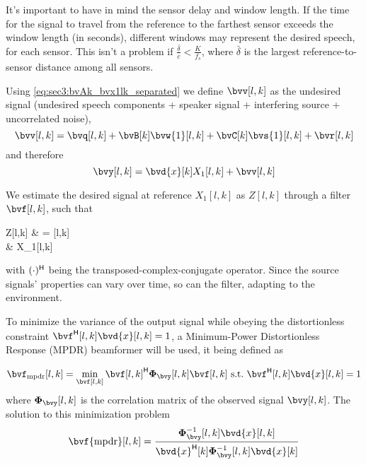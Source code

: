 It's important to have in mind the sensor delay and window length. If the time for the signal to travel from the reference to the farthest sensor exceeds the window length (in seconds), different windows may represent the desired speech, for each sensor. This isn't a problem if $\frac{\bar{\delta}}{c} < \frac{K}{f_s}$, where $\bar{\delta}$ is the largest reference-to-sensor distance among all sensors.

Using \cref{eq:sec3:bvAk_bvx1lk_separated} we define $\bvv[l,k]$ as the undesired signal (undesired speech components + speaker signal + interfering source + uncorrelated noise),
\begin{equation}
	\label{eq:sec3:def_undes_sig_bvwlk}
	\bvv[l,k] = \bvq[l,k] + \bvB[k] \bvw{1}[l,k] + \bvC[k] \bvs{1}[l,k] + \bvr[l,k]
\end{equation}
and therefore
\begin{equation}
	\label{eq:sec3:time-freq_model_final}
	\bvy[l,k] = \bvd{x}[k] X_1[l,k] + \bvv[l,k]
\end{equation}

We estimate the desired signal at reference $X_1[l,k]$ as $Z[l,k]$ through a filter $\bvf[l,k]$, such that
\begin{equations}
	Z[l,k]
	& = \he{\bvf}[l,k] \bvy[l,k] \\
	& \approx X_1[l,k]
\end{equations}
with $\he{(\cdot)}$ being the transposed-complex-conjugate operator. Since the source signals' properties can vary over time, so can the filter, adapting to the environment.

To minimize the variance of the output signal while obeying the distortionless constraint $\he{\bvf}[l,k] \bvd{x}[l,k] = 1$, a Minimum-Power Distortionless Response (MPDR) beamformer will be used, it being defined as

\begin{equation}
	\label{eq:sec3:minimization_problem_mpdr}
	\bvf_{\mpdr}[l,k] = \min_{\bvf[l,k]} \he{\bvf[l,k]} \Corr{\bvy}[l,k] \bvf[l,k]~\text{s.t.}~\he{\bvf}[l,k] \bvd{x}[l,k] = 1
\end{equation}
where $\Corr{\bvy}[l,k]$ is the correlation matrix of the observed signal $\bvy[l,k]$. The solution to this minimization problem 
\begin{equation}
	\label{eq:sec3:solution_mpdr_beamformer}
	\bvf{\mpdr}[l,k] = \frac{\iCorr{\bvy}[l,k] \bvd{x}[l,k]}{\he{\bvd{x}}[k] \iCorr{\bvy}[l,k] \bvd{x}[k]}
\end{equation}

